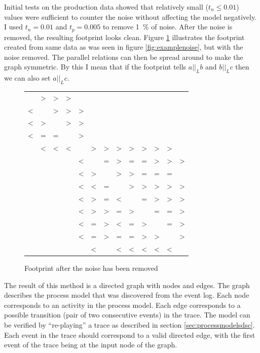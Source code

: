 Initial tests on the production data showed that relatively small ($t_n \le 0.01$) values were sufficient to counter the noise without affecting the model negatively. 
I used $t_n = 0.01$ and $t_p = 0.005$ to remove 1~\% of noise.
After the noise is removed, the resulting footprint looks clean.
Figure \ref{fig:footprintafter} illustrates the footprint created from same data as was seen in figure \ref{fig:examplenoise}, but with the noise removed.
The parallel relations can then be spread around to make the graph symmetric.
By this I mean that if the footprint tells $a ||_L b$ and $b ||_L c$ then we can also set $a ||_L c$.

\begin{figure}[htb]
    \centering
    \begin{tabular}{ccccccccccccc}
          & > & > & > &   &   &   &   &   &   &   &   &   \\
        < &   & > & > & > &   &   &   &   &   &   &   &   \\
        < & > &   & > & > &   &   &   &   &   &   &   &   \\
        < & = & = &   & > &   &   &   &   &   &   &   &   \\
          & < & < & < &   & > & > & > & > & > & > & > &   \\
          &   &   &   & < &   & = & > & = & = & > & > & > \\
          &   &   &   & < & > &   & > & > & = & = & = &   \\
          &   &   &   & < & < & = &   & > & > & > & > & > \\
          &   &   &   & < & > & = & < &   & = & > & > & > \\
          &   &   &   & < & > & > & = & > &   & = & = & > \\
          &   &   &   & < & = & > & < & = & > &   & = & > \\
          &   &   &   & < & = & > & = & = & > & > &   & > \\
          &   &   &   &   & < &   & < & < & < & < & < &   \\
    \end{tabular}
    \caption{Footprint after the noise has been removed}
    \label{fig:footprintafter}
\end{figure}

The result of this method is a directed graph with nodes and edges.
The graph describes the process model that was discovered from the event log.
Each node corresponds to an activity in the process model.
Each edge corresponds to a possible transition (pair of two consecutive events) in the trace.
The model can be verified by ``re-playing'' a trace as described in section \ref{sec:processmodelsdsc}.
Each event in the trace should correspond to a valid directed edge, with the first event of the trace being at the input node of the graph.

